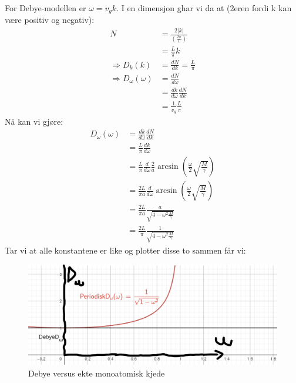 \documentclass{article}
\begin{document}
For Debye-modellen er $\omega = v_g k$. I en dimensjon ghar vi da at (2eren fordi k kan være positiv og negativ):
\begin{align}
    N &= \frac{2|k|}{\left(\frac{2\pi}{L}\right)}\\
      &= \frac{L}{\pi} k\\
    \Rightarrow D_k(k) &= \frac{dN}{dk} = \frac{L}{\pi}\\
    \Rightarrow D_\omega(\omega) &= \frac{dN}{d\omega} \\
    &= \frac{dk}{d\omega}\frac{dN}{dk} \\
    &= \frac{1}{v_g}\frac{L}{\pi}
\end{align}
Nå kan vi gjøre:
\begin{align}
     D_\omega(\omega) &= \frac{dk}{d\omega} \frac{dN}{dk} \\
     &=\frac{L}{\pi } \frac{dk}{d\omega} \\
     &= \frac{L}{\pi } \frac{d}{d\omega} \frac{2}{a}\arcsin{\left(\frac{\omega}{2}\sqrt{\frac{M}{\gamma}}\right)}\\
     &= \frac{2L}{\pi a} \frac{d}{d\omega} \arcsin{\left(\frac{\omega}{2}\sqrt{\frac{M}{\gamma}}\right)}\\
     &= \frac{2L}{\pi a}  \frac{a}{\sqrt{4-\omega^2 \frac{M}{\gamma}}}\\
     &= \frac{2L}{\pi}  \frac{1}{\sqrt{4-\omega^2 \frac{M}{\gamma}}}
\end{align}
Tar vi at alle konstantene er like og plotter disse to sammen får vi:
\begin{figure}[H]
    \centering
    \includegraphics[width=0.4\linewidth]{bilder_lf/debye_versus_ekte_monoatomisk_kjede.png}
    \caption{Debye versus ekte monoatomisk kjede}
    \label{fig:debye_versus_ekte_monoatomisk_kjede}
\end{figure}
\nyside
{}
\nyside
{}
\nyside
{}
\nyside
{}
\newpage
\printbibliography
\end{document}
